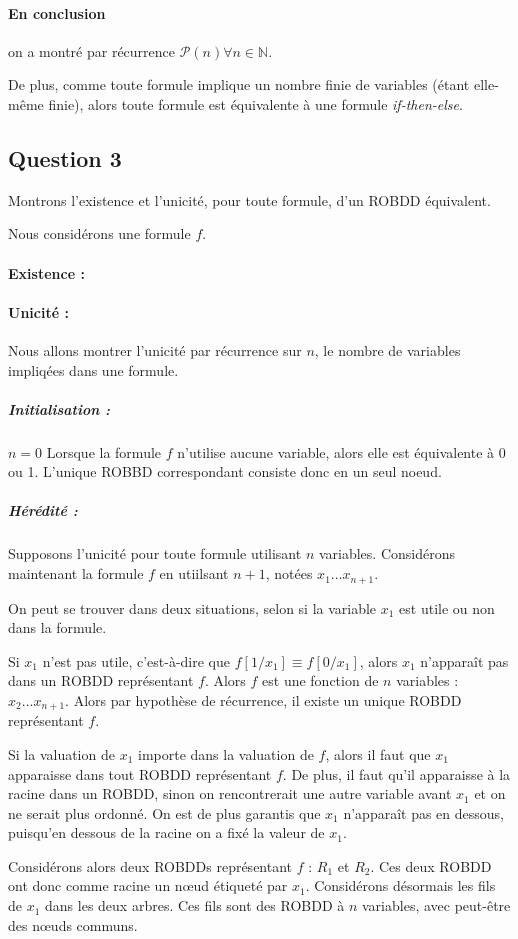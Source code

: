 \documentclass[12pt]{article}
\def\question#1{\subsection*{Question #1}}
\def\ite{\textit{if-then-else}}
\def\P{\mathcal{P}}
\begin{document}
\paragraph{En conclusion} on a montré par récurrence $\P (n)\forall n\in\mathbb{N}$.

De plus, comme toute formule implique un nombre finie de variables (étant elle-même finie), alors toute formule est équivalente à une formule \ite.

\question{3}
Montrons l'existence et l'unicité, pour toute formule, d'un ROBDD équivalent.

Nous considérons une formule $f$.
\paragraph{Existence :}

\paragraph{Unicité :} 
Nous allons montrer l'unicité par récurrence sur $n$, le nombre de variables impliqées dans une formule.

\subparagraph{Initialisation :}
$n = 0$ Lorsque la formule $f$ n'utilise aucune variable, alors elle est équivalente à 0 ou 1. L'unique ROBBD correspondant consiste donc en un seul noeud.

\subparagraph{Hérédité :}
Supposons l'unicité pour toute formule utilisant $n$ variables. Considérons maintenant la formule $f$ en utiilsant $n+1$, notées $x_1\dots x_{n+1}$.

On peut se trouver dans deux situations, selon si la variable $x_1$ est utile ou non dans la formule.

Si $x_1$ n'est pas utile, c'est-à-dire que $f[1/x_1]\equiv f[0/x_1]$, alors $x_1$ n'apparaît pas dans un ROBDD représentant $f$. Alors $f$ est une fonction de $n$ variables : $x_2\dots x_{n+1}$. Alors par hypothèse de récurrence, il existe un unique ROBDD représentant $f$.

Si la valuation de $x_1$ importe dans la valuation de $f$, alors il faut que $x_1$ apparaisse dans tout ROBDD représentant $f$. De plus, il faut qu'il apparaisse à la racine dans un ROBDD, sinon on rencontrerait une autre variable avant $x_1$ et on ne serait plus ordonné. On est de plus garantis que $x_1$ n'apparaît pas en dessous, puisqu'en dessous de la racine on a fixé la valeur de $x_1$.

Considérons alors deux ROBDDs représentant $f$ : $R_1$ et $R_2$. Ces deux ROBDD ont donc comme racine un n\oe ud étiqueté par $x_1$. Considérons désormais les fils de $x_1$ dans les deux arbres. Ces fils sont des ROBDD à $n$ variables, avec peut-être des n\oe uds communs.
\end{document}
